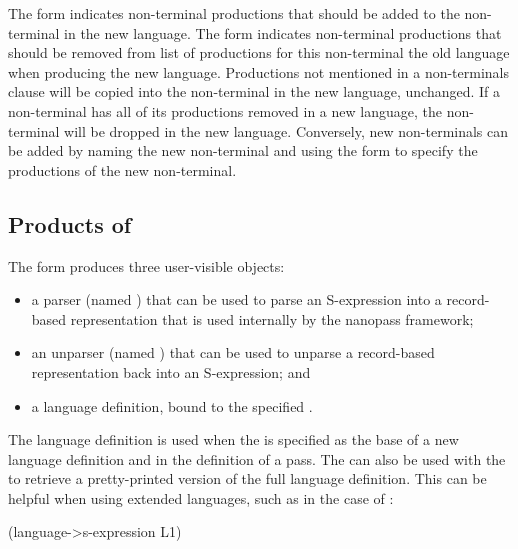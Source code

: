 \documentclass[letterpaper,10pt]{article}
\begin{document}
The \scheme{+} form indicates non-terminal productions that should be added to
the non-terminal in the new language.
The \scheme{-} form indicates non-terminal productions that should be removed
from list of productions for this non-terminal the old language when producing
the new language.
Productions not mentioned in a non-terminals clause will be copied into the
non-terminal in the new language, unchanged.
If a non-terminal has all of its productions removed in a new language, the
non-terminal will be dropped in the new language.
Conversely, new non-terminals can be added by naming the new non-terminal and
using the \scheme{+} form to specify the productions of the new non-terminal.

\begin{schemeregion}
\subsection{Products of }
\end{schemeregion}


The  form produces three user-visible objects:
\begin{itemize}
\item a parser (named ) that can be used to
parse an S-expression into a record-based representation that is used
internally by the nanopass framework;
\item an unparser (named ) that can be used
to unparse a record-based representation back into an S-expression; and
\item a language definition, bound to the specified .
\end{itemize}

The language definition is used when the  is specified as
the base of a new language definition and in the definition of a pass.
The  can also be used with the
 to retrieve a pretty-printed version of the
full language definition.
This can be helpful when using extended languages, such as in the case of
:

\begin{schemedisplay}
(language->s-expression L1)
\end{schemedisplay}
\end{document}
